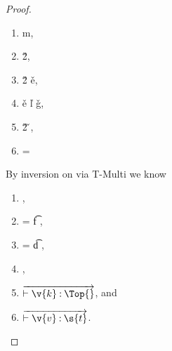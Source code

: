 \begin{lemma}
\begin{proof}
\begin{case}[T-App]
\begin{itemize}
\begin{subcase}[B-BetaMulti]
  \begin{enumerate}
    \item
  \opsem {\openv{}}
         {}
         { {m}},
    \item
  \opsem {\openv{}}
         {}
         {\v{2}},
    \item
  \opsem {\openv{}}
         { {\v{2}}}
         {\v{e}},
    \item
  \getmethod {\disptable{}}
             {\v{e}}
             {\v{l}}
             {\v{g}},
    \item
  \opsem {\openv{}}
         { {\v{2}}}
         {\v{}},
       \item {\disptable{}} = {}
     \end{enumerate}

     By inversion on  via T-Multi we know 
     \begin{enumerate}[resume]
       \item
                {
                            {}}
                {},
           
         \item {} = {\ArrowOne {\x{}} {\s{}}
                                                       {\t{f}}
                                                       {
                                                                   {}}
                                                       {}},
         \item {} = {\ArrowOne {\x{}} {\s{}}
                                                       {\t{d}}
                                                       {
                                                                   {}}
                                                       {}},
       \item
                {
                            {}}
                {},
              \item
  $\overrightarrow{\judgementtwo{}{\hastype{\v{k}}{\Top{}}}}$, and 
\item
  $\overrightarrow{\judgementtwo{}{\hastype{\v{v}}{\s{t}}}}$.
  \end{enumerate}


\end{subcase}
\end{itemize}
\end{case}
\end{proof}
\end{lemma}
